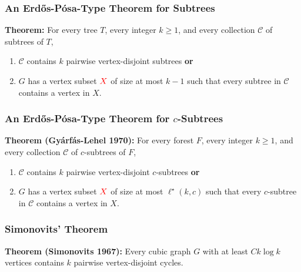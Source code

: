 \documentclass{beamer}
\begin{document}
\begin{frame}
  \frametitle{An Erdős-Pósa-Type Theorem for Subtrees}

  \noindent\textbf{Theorem:} For every tree $T$, every integer $k\ge 1$,  and every collection $\mathcal{C}$ of subtrees of $T$,
  \begin{enumerate}%
    \item $\mathcal{C}$ contains $k$ pairwise vertex-disjoint subtrees \textbf{or}
    \item $G$ has a vertex subset $\mathcolor{red}{X}$ of size at most $k-1$ such that every subtree in $\mathcal{C}$ contains a vertex in $X$.
  \end{enumerate}
\end{frame}


\begin{frame}
  \frametitle{An Erdős-Pósa-Type Theorem for $c$-Subtrees}


  \noindent\textbf{Theorem (Gyárfás-Lehel 1970):} For every forest $F$, every integer $k\ge 1$, and every collection $\mathcal{C}$ of $c$-subtrees of $F$,
  \begin{enumerate}%
    \item $\mathcal{C}$ contains $k$ pairwise vertex-disjoint $c$-subtrees \textbf{or}
    \item $G$ has a vertex subset $\mathcolor{red}{X}$ of size at most $\ell^\star(k,c)$ such that every $c$-subtree in $\mathcal{C}$ contains a vertex in $X$.
  \end{enumerate}
\end{frame}


\begin{frame}
  \frametitle{Simonovits' Theorem}


  \noindent\textbf{Theorem (Simonovits 1967):} Every cubic graph $G$ with at least $C k\log k$ vertices contains $k$ pairwise vertex-disjoint cycles.
\end{frame}
\end{document}
